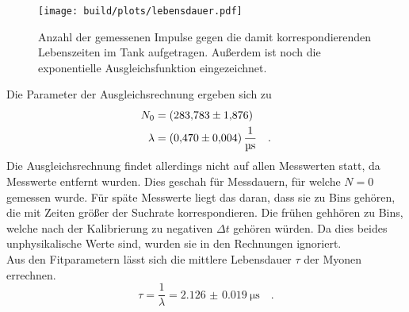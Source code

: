 \begin{figure}[H]
  \centering
  \texttt{[image: build/plots/lebensdauer.pdf]}
  \caption{Anzahl der gemessenen Impulse gegen die damit korrespondierenden Lebenszeiten im Tank aufgetragen. Außerdem ist noch die exponentielle Ausgleichsfunktion eingezeichnet.}
  \label{img:lebensdauer}
\end{figure}
\noindent
Die Parameter der Ausgleichsrechnung ergeben sich zu
\begin{align*}
  N_0    &=\SI{283.783 (1876)}{} \\
  \lambda&=\SI{0.470(0004)}{\per\micro\second} \quad .
\end{align*}
Die Ausgleichsrechnung findet allerdings nicht auf allen Messwerten statt, da Messwerte entfernt wurden.
Dies geschah für Messdauern, für welche $N=0$ gemessen wurde.
Für späte Messwerte liegt das daran, dass sie zu Bins gehören, die mit Zeiten größer der Suchrate korrespondieren. 
Die frühen gehhören zu Bins, welche nach der Kalibrierung zu negativen $\Delta t$ gehören würden.  
Da dies beides unphysikalische Werte sind, wurden sie in den Rechnungen ignoriert.\\
Aus den Fitparametern lässt sich die mittlere Lebensdauer $\tau$ der Myonen errechnen.
\begin{equation*}
  \tau= \frac{1}{\lambda} = \SI{2.126(0019)}{\micro\second} \quad .
\end{equation*}
